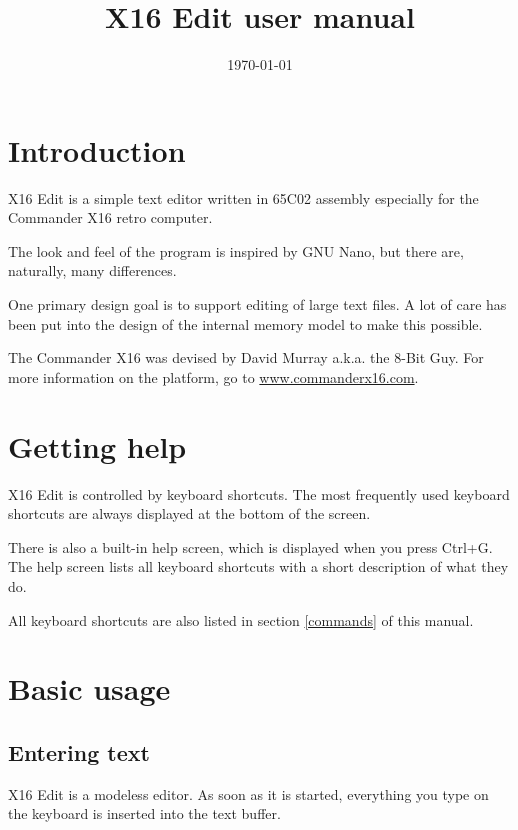 \documentclass{article}
\title{X16 Edit user manual}
\date{\today}
\begin{document}
\maketitle

\section{Introduction}

    X16 Edit is a simple text editor written in 65C02 assembly especially
    for the Commander X16 retro computer. 
    
    The look and feel of the program is inspired by GNU Nano, but there are,
    naturally, many differences.
    
    One primary design goal is to support editing of large text 
    files. A lot of care has been put into the design of
    the internal memory model to make this possible.

    The Commander X16 was devised by David Murray a.k.a. the 
    8-Bit Guy. For more information on the platform, go to 
    \href{http://www.commanderx16.com}{www.commanderx16.com}.

\section{Getting help}

    X16 Edit is controlled by keyboard shortcuts. The most frequently used keyboard 
    shortcuts are always displayed at the bottom of the screen.
    
    There is also a built-in help screen, which is displayed when you press
    Ctrl+G. The help screen lists all keyboard shortcuts with a short description
    of what they do.

    All keyboard shortcuts are also listed in section \ref{commands} of this manual.

\section{Basic usage}

    \subsection{Entering text}
           
        X16 Edit is a modeless editor. As soon as it is started, everything you
        type on the keyboard is inserted into the text buffer.
        
\end{document}
